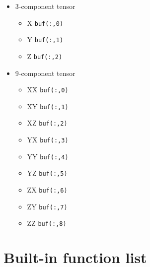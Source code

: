 \documentclass[]{article}
\begin{document}
\begin{itemize}
\itemsep1pt\parskip0pt
\item
  3-component tensor

  \begin{itemize}
  \itemsep1pt\parskip0pt
  \item
    X \texttt{buf(:,0)}
  \item
    Y \texttt{buf(:,1)}
  \item
    Z \texttt{buf(:,2)}
  \end{itemize}
\item
  9-component tensor

  \begin{itemize}
  \itemsep1pt\parskip0pt
  \item
    XX \texttt{buf(:,0)}
  \item
    XY \texttt{buf(:,1)}
  \item
    XZ \texttt{buf(:,2)}
  \item
    YX \texttt{buf(:,3)}
  \item
    YY \texttt{buf(:,4)}
  \item
    YZ \texttt{buf(:,5)}
  \item
    ZX \texttt{buf(:,6)}
  \item
    ZY \texttt{buf(:,7)}
  \item
    ZZ \texttt{buf(:,8)}
  \end{itemize}
\end{itemize}

\section{Built-in function list}\label{built-in-function-list}
\end{document}
